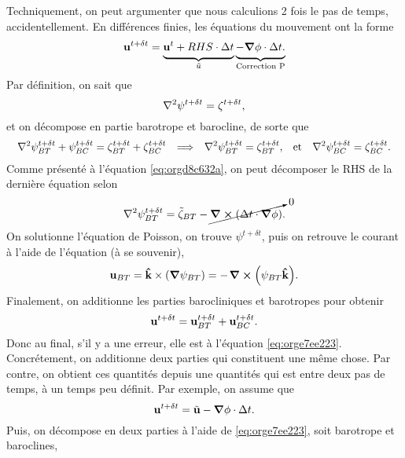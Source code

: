 \documentclass[10pt]{article}
\numberwithin{equation}{section}
\newcommand{\kvf}{\vb{\hat{k}}}
\newcommand{\uu}{\vb{u}}
\newcommand{\tall}{\vphantom{pA^{x^x}_p}}
\newcommand{\pt}{\hspace{1pt}} %
\begin{document}
Techniquement, on peut argumenter que nous calculions 2 fois le pas de temps, accidentellement.
En différences finies, les équations du mouvement ont la forme
\begin{equation}
\label{eq:orgd8c632a}
   \uu^{t+\delta t} =
   \underbrace{\uu^t + RHS\cdot \Delta t\tall}_{\tilde{u}}
   \underbrace{- \gradient{\phi}\cdot \Delta t.\tall}_\text{Correction P}
\end{equation}
Par définition, on sait que
\begin{equation}
   \laplacian{\psi^{t+\delta t}} = \zeta^{t+\delta t},
\end{equation}
et on décompose en partie barotrope et barocline, de sorte que
\begin{align}
   && \laplacian{\psi^{t+\delta t}_{BT} + \psi^{t+\delta t}_{BC}} = \zeta^{t+\delta t}_{BT} + \zeta^{t+\delta t}_{BC}
   && \Longrightarrow
   && \laplacian{\psi^{t+\delta t}}_{BT} = \zeta^{t+\delta t}_{BT},
   && \text{et}
   && \laplacian{\psi^{t+\delta t}}_{BC} = \zeta^{t+\delta t}_{BC}.&&
\end{align}
Comme présenté à l'équation \ref{eq:orgd8c632a}, on peut décomposer le RHS de la dernière équation selon
\begin{align}
   \laplacian{\psi^{t+\delta t}}_{BT} = \tilde{\zeta}_{BT} - \cancelto{0}{\curl(\Delta t\cdot\gradient{\phi})}.
\end{align}
On solutionne l'équation de Poisson, on trouve \(\psi^{t+\delta t}\), puis on retrouve le courant à l'aide de l'équation (à se souvenir), 
\begin{equation}
   \uu_{BT} = \kvf \times \qty(\gradient{\psi_{BT}}) = - \pt\curl(\psi_{BT}\kvf).
\end{equation}
Finalement, on additionne les parties barocliniques et barotropes pour obtenir
\begin{equation}
\label{eq:orge7ee223}
   \uu^{t+\delta t} = \uu_{BT}^{t+\delta t} + \uu_{BC}^{t+\delta t}.
\end{equation}
Donc au final, s'il y a une erreur, elle est à l'équation \ref{eq:orge7ee223}.
Concrétement, on additionne deux parties qui constituent une même chose.
Par contre, on obtient ces quantités depuis une quantités qui est entre deux pas de temps, à un temps peu définit.
Par exemple, on assume que
\begin{equation}
   \uu^{t+\delta t} = \tilde{\uu} - \gradient{\phi} \cdot \Delta t.
\end{equation}
Puis, on décompose en deux parties à l'aide de \ref{eq:orge7ee223}, soit barotrope et baroclines,
\end{document}
